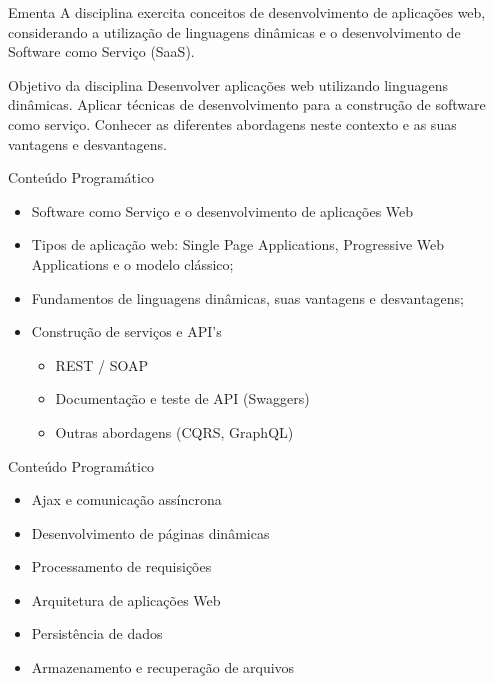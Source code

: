 \documentclass{beamer}
\begin{document}
\begin{frame}{Ementa}\justifying
      A disciplina exercita conceitos de desenvolvimento de aplicações web, considerando a
      utilização de linguagens dinâmicas e o desenvolvimento de Software como Serviço (SaaS).
\end{frame}

\begin{frame}{Objetivo da disciplina}\justifying
      Desenvolver aplicações web utilizando linguagens dinâmicas. Aplicar técnicas de desenvolvimento para a construção de software como serviço. Conhecer as diferentes abordagens neste contexto e as suas vantagens e desvantagens.
\end{frame}

\begin{frame}{Conteúdo Programático}\justifying
      \begin{itemize}
            \item Software como Serviço e o desenvolvimento de aplicações Web
            \item Tipos de aplicação web: Single Page Applications, Progressive Web Applications e o
            modelo clássico;
            \item Fundamentos de linguagens dinâmicas, suas vantagens e desvantagens;
            \item Construção de serviços e API’s
                  \begin{itemize}
                        \item REST / SOAP
                        \item Documentação e teste de API (Swaggers)
                        \item Outras abordagens (CQRS, GraphQL)
                  \end{itemize}
            
            
      \end{itemize}
\end{frame}

\begin{frame}{Conteúdo Programático}\justifying
      \begin{itemize}
            \item Ajax e comunicação assíncrona
            \item Desenvolvimento de páginas dinâmicas
            \item Processamento de requisições
            \item Arquitetura de aplicações Web
            \item Persistência de dados
            \item Armazenamento e recuperação de arquivos
           
      \end{itemize}
\end{frame}
\end{document}

